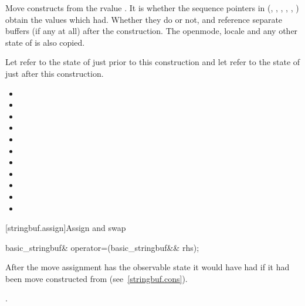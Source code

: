 \begin{itemdescr}
\pnum
\effects Move constructs from the rvalue . It
is
 whether the sequence pointers in 
(, , ,
, , ) obtain
the values which  had. Whether they do or not, 
and  reference separate buffers (if any at all) after the
construction. The openmode, locale and any other state of  is
also copied.

\pnum
\postconditions Let  refer to the state of
 just prior to this construction and let 
refer to the state of  just after this construction.

\begin{itemize}
\item {}
\item {}
\item {}
\item {}
\item {}
\item {}
\item {}
\item {}
\item {}
\item {}
\item {}
\end{itemize}
\end{itemdescr}

[stringbuf.assign]{Assign and swap}

%
%
\begin{itemdecl}
basic_stringbuf& operator=(basic_stringbuf&& rhs);
\end{itemdecl}

\begin{itemdescr}
\pnum
\effects After the move assignment  has the observable state it would
have had if it had been move constructed from  (see~\ref{stringbuf.cons}).

\pnum
\returns {}.
\end{itemdescr}

